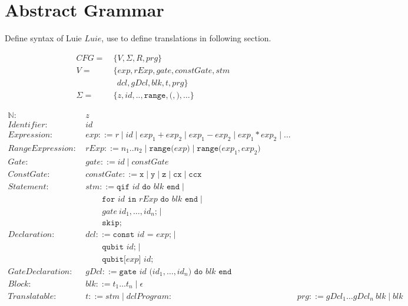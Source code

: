 \section{Abstract Grammar}
\label{sec:concept_abstractGrammar}
Define syntax of Luie $Luie$, use to define translations in following section.

\begin{align*}
    CFG = \ & \{V, \Sigma, R, prg \}\\ 
    V = \ & \{ exp, rExp, gate, constGate, stm\\ 
            & \ \ dcl, gDcl, blk, t, prg\}\\ 
    \Sigma = \ & \{ z, id, \texttt{..}, \texttt{range}, \texttt{(}, \texttt{)}, \dots\} 
\end{align*}

\begin{align*}
    \mathbb{N}: \ & z \\
    Identifier: \ & id \\
    Expression: \ & exp ::= r \mid id \mid exp_1 + exp_2 \mid exp_1 - exp_2 \mid exp_1 * exp_2 \mid \dots\\
    RangeExpression: \ & rExp ::= n_1 .. n_2 \mid \texttt{range(} exp \texttt{)} \mid \texttt{range(} exp_1, exp_2 \texttt{)}\\
    Gate: \ & gate ::= id \mid constGate\\
    ConstGate: \ & constGate ::= \texttt{x} \mid \texttt{y} \mid \texttt{z} \mid \texttt{cx} \mid \texttt{ccx}\\
    Statement: \ & stm ::= \texttt{qif } id \texttt{ do }  blk \texttt{ end} \mid \\
               & \quad \quad \texttt{for } id \texttt{ in } rExp \texttt{ do } blk \texttt{ end} \mid \\
               & \quad \quad gate \ id_1, \dots, id_n \texttt{;} \mid \\
               & \quad \quad \texttt{skip;}\\
    Declaration: \ & dcl ::= \texttt{const } id \texttt{ = } exp \texttt{;} \mid \\
                 & \quad \quad \texttt{qubit } id \texttt{;} \mid \\
                 & \quad \quad \texttt{qubit[} exp \texttt{] } id \texttt{;}\\
    GateDeclaration: \ & gDcl::= \texttt{gate } id \texttt{ (}id_1, \dots, id_n\texttt{) do } blk \texttt{ end}\\
    Block: \ & blk::= t_1 \dots t_n \mid \epsilon\\
    Translatable : \ & t::= stm \mid dcl
    Program: \ & prg ::= gDcl_1 \dots gDcl_n \ blk \mid blk 
\end{align*}